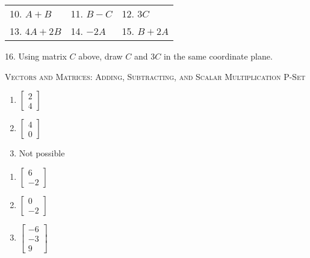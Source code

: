 \documentclass{article}
\newcounter{Answers}
\begin{document}
\begin{tabular}{p{}p{}p{}}
10. \quad $A + B$   &
11. \quad $B - C$   &
12. \quad $3C$      \\[10pt]
13. \quad $4A + 2B$ &
14. \quad $-2A$     &
15. \quad $B + 2A$  \\[15pt]
\end{tabular}

16. \quad Using matrix $C$ above, draw $C$ and $3C$ in the same coordinate plane.

\newpage

\textsc{Vectors and Matrices: Adding, Subtracting, and Scalar Multiplication P-Set}

\begin{multicols}{3}
\begin{enumerate}
 \setlength\itemsep{10pt}
     \item $\begin{bmatrix} 2 \\ 4 \end{bmatrix}$
     \item $\begin{bmatrix} 4 \\ 0 \end{bmatrix}$
     \item Not possible
\setcounter{Answers}{\value{enumi}}
\end{enumerate}
\end{multicols}
\vspace{0.2in}
\begin{multicols}{3}
\begin{enumerate}
\setcounter{enumi}{\value{Answers}}
     \item $\begin{bmatrix} 6 \\ -2 \end{bmatrix}$
     \item $\begin{bmatrix} 0 \\ -2 \end{bmatrix}$
     \item $\begin{bmatrix} -6 \\ -3 \\ 9 \end{bmatrix}$
\setcounter{Answers}{\value{enumi}}
\end{enumerate}
\end{multicols}
\vspace{0.2in}
\end{document}
